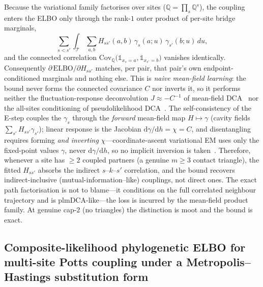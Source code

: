 \begin{remark}
\label{rem:mf-recovers}
Because the variational family factorises over sites
($\mathbb{Q}=\prod_s \mathbb{Q}^s$), the coupling enters the ELBO only
through the rank-$1$ outer product of per-site bridge marginals,
\[
  \sum_{s<s'}\int_{\mathcal T}\sum_{a,b}
     H_{ss'}(a,b)\,\gamma_s(a;u)\,\gamma_{s'}(b;u)\,du,
\]
and the connected correlation
$\mathrm{Cov}_{\mathbb Q}\!\bigl(\mathbb 1_{x_s=a},\mathbb 1_{x_{s'}=b}\bigr)$
vanishes identically. Consequently
$\partial\,\mathrm{ELBO}/\partial H_{ss'}$ matches, per pair, that pair's
own endpoint-conditioned marginals and nothing else. This is
\emph{naive mean-field learning}: the bound never forms the connected
covariance $C$ nor inverts it, so it performs neither the
fluctuation-response deconvolution $J\approx -C^{-1}$ of mean-field
DCA~\citep{Morcos2011} nor the all-sites conditioning of pseudolikelihood
DCA~\citep{ekeberg2013}. The self-consistency of the E-step couples the
$\gamma_s$ through the \emph{forward} mean-field map $H\mapsto\gamma$
(cavity fields $\sum_{s'}H_{ss'}\gamma_{s'}$); linear response is the
Jacobian $\mathrm{d}\gamma/\mathrm{d}h=\chi=C$, and disentangling requires
forming \emph{and inverting} $\chi$---coordinate-ascent variational EM uses
only the fixed-point values $\gamma$, never $\mathrm{d}\gamma/\mathrm{d}h$,
so no implicit inversion is taken~\citep{kappenrodriguez1998,tanaka1998}.
Therefore, whenever a site has $\ge 2$ coupled partners (a genuine
$m\ge 3$ contact triangle), the fitted $H_{ss'}$ absorbs the indirect
$s$--$k$--$s'$ correlation, and the bound recovers indirect-inclusive
(mutual-information--like) couplings, not direct ones. The exact path
factorisation is not to blame---it conditions on the full correlated
neighbour trajectory and is plmDCA-like---the loss is incurred by the
mean-field product family. At genuine cap-$2$ (no triangles) the
distinction is moot and the bound is exact.
\end{remark}

\subsection{Composite-likelihood phylogenetic ELBO for multi-site Potts
coupling under a Metropolis--Hastings substitution form}
\label{sec:composite-mh-elbo}

